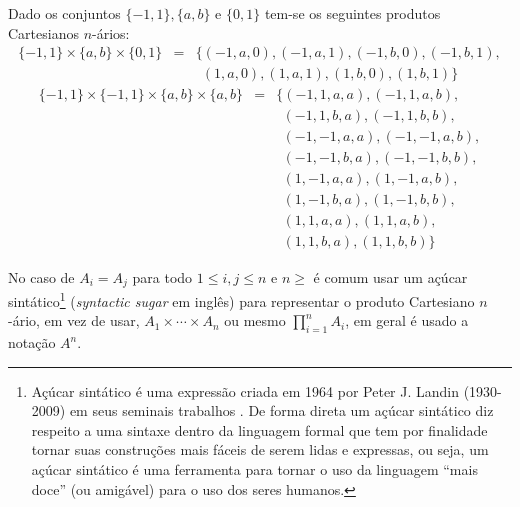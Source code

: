 \begin{example}\label{exe:CartesianoNario1}
	Dado os conjuntos $\{-1, 1\}, \{a, b\}$ e $\{0, 1\}$ tem-se os seguintes produtos Cartesianos $n$-ários:
	\begin{eqnarray*}
		\{-1, 1\} \times \{a, b\} \times \{0, 1\} & = & \{(-1, a, 0), (-1, a, 1), (-1, b, 0), (-1, b, 1), \\
		& & \ \ (1, a, 0), (1, a, 1), (1, b, 0), (1, b, 1)\}
	\end{eqnarray*}
	\begin{eqnarray*}
		\{-1, 1\} \times \{-1, 1\} \times \{a, b\} \times \{a, b\} & = & \{ (-1, 1, a, a), (-1, 1, a, b), \\
		& & \ \ (-1, 1, b, a),  (-1, 1, b, b), \\
		& & \ \ (-1, -1, a, a), (-1, -1, a, b),\\
		& & \ \ (-1, -1, b, a), (-1, -1, b, b),\\
		& & \ \ (1, -1, a, a),  (1, -1, a, b),\\
		& & \ \ (1, -1, b, a),  (1, -1, b, b),\\
		& & \ \ (1, 1, a, a),   (1, 1, a, b),\\
		& & \ \ (1, 1, b, a),   (1, 1, b, b) \}
	\end{eqnarray*}
\end{example} 

\begin{note}
	No caso de $A_i = A_j$ para todo $1 \leq i, j \leq n$ e $n \geq$ é comum usar um açúcar sintático\footnote{Açúcar sintático é uma expressão criada em 1964 por Peter J. Landin (1930-2009) em seus seminais trabalhos \cite{landin1964, landin1965}. De forma direta um açúcar sintático diz respeito a uma sintaxe dentro da linguagem formal que tem por finalidade tornar suas construções mais fáceis de serem lidas e expressas, ou seja, um açúcar sintático é uma ferramenta para tornar o uso da linguagem ``mais doce'' (ou amigável) para o uso dos seres humanos.} (\textit{syntactic sugar} em inglês) para representar o produto Cartesiano $n$-ário, em vez de usar, $A_1 \times \cdots \times A_n$ ou mesmo $\displaystyle\prod_{i = 1}^{n} A_i$, em geral é usado a notação $A^n$.
\end{note}

